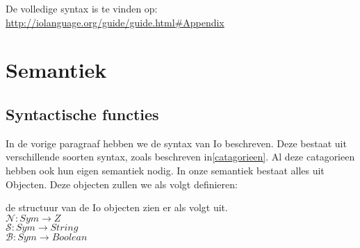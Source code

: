 \documentclass[12pt]{article}
\begin{document}
De volledige syntax is te vinden op: \url{http://iolanguage.org/guide/guide.html#Appendix}

\pagebreak
\section{Semantiek}

\subsection{Syntactische functies}
In de vorige paragraaf hebben we de syntax van Io beschreven. Deze bestaat uit verschillende soorten syntax, zoals beschreven in\ref{catagorieen}.
Al deze catagorieen hebben ook hun eigen semantiek nodig. 
In onze semantiek bestaat alles uit Objecten. Deze objecten zullen we als volgt definieren:

%
%
% 

de structuur van de Io objecten zien er als volgt uit. \\
$\mathcal{N}: Sym \rightarrow Z $ \\
$\mathcal{S}: Sym \rightarrow String $ \\
$\mathcal{B}: Sym \rightarrow Boolean $ \\
\end{document}
